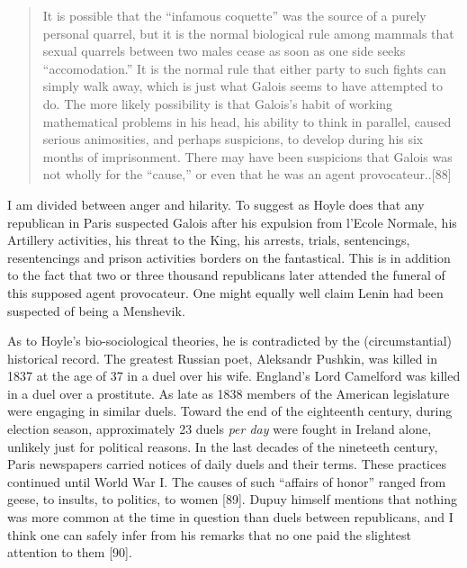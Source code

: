 \documentclass[12pt]{article}
\begin{document}
\begin{quote}
It is possible that the ``infamous coquette'' was the source of a purely personal quarrel, but it is the normal biological rule among mammals that sexual quarrels between two males cease as soon as one side seeks ``accomodation.'' It is the normal rule that either party to such fights can simply walk away, which is just what Galois seems to have attempted to do. The more likely possibility is that Galois's habit of working mathematical problems in his head, his ability to think in parallel, caused serious animosities, and perhaps suspicions, to develop during his six months of imprisonment. There may have been suspicions that Galois was not wholly for the ``cause,'' or even that he was an agent provocateur..[88]
\end{quote}
I am divided between anger and hilarity. To suggest as Hoyle does that any republican in Paris suspected Galois after his expulsion from l'Ecole Normale, his Artillery activities, his threat to the King, his arrests, trials, sentencings, resentencings and prison activities borders on the fantastical. This is in addition to the fact that two or three thousand republicans later attended the funeral of this supposed agent provocateur. One might equally well claim Lenin had been suspected of being a Menshevik.

As to Hoyle's bio-sociological theories, he is contradicted by the (circumstantial) historical record. The greatest Russian poet, Aleksandr Pushkin, was killed in 1837 at the age of 37 in a duel over his wife. England's Lord Camelford was killed in a duel over a prostitute. As late as 1838 members of the American legislature were engaging in similar duels. Toward the end of the eighteenth century, during election season, approximately 23 duels \emph{per day }were fought in Ireland alone, unlikely just for political reasons. In the last decades of the nineteeth century, Paris newspapers carried notices of daily duels and their terms. These practices continued until World War I. The causes of such ``affairs of honor'' ranged from geese, to insults, to politics, to women [89]. Dupuy himself mentions that nothing was more common at the time in question than duels between republicans, and I think one can safely infer from his remarks that no one paid the slightest attention to them [90].
\end{document}
